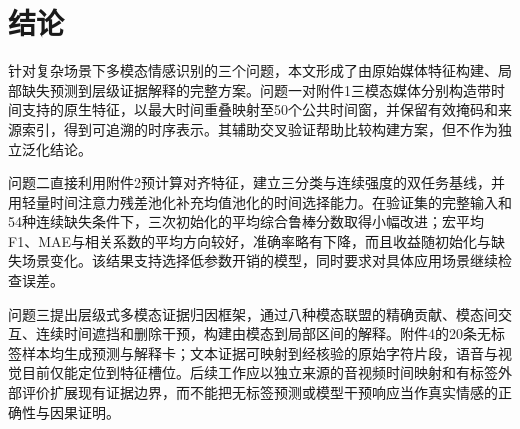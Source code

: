 \section{结论}\label{sec:conclusion}
针对复杂场景下多模态情感识别的三个问题，本文形成了由原始媒体特征构建、局部缺失预测到层级证据解释的完整方案。问题一对附件1三模态媒体分别构造带时间支持的原生特征，以最大时间重叠映射至50个公共时间窗，并保留有效掩码和来源索引，得到可追溯的时序表示。其辅助交叉验证帮助比较构建方案，但不作为独立泛化结论。

问题二直接利用附件2预计算对齐特征，建立三分类与连续强度的双任务基线，并用轻量时间注意力残差池化补充均值池化的时间选择能力。在验证集的完整输入和54种连续缺失条件下，三次初始化的平均综合鲁棒分数取得小幅改进；宏平均F1、MAE与相关系数的平均方向较好，准确率略有下降，而且收益随初始化与缺失场景变化。该结果支持选择低参数开销的模型，同时要求对具体应用场景继续检查误差。

问题三提出层级式多模态证据归因框架，通过八种模态联盟的精确贡献、模态间交互、连续时间遮挡和删除干预，构建由模态到局部区间的解释。附件4的20条无标签样本均生成预测与解释卡；文本证据可映射到经核验的原始字符片段，语音与视觉目前仅能定位到特征槽位。后续工作应以独立来源的音视频时间映射和有标签外部评价扩展现有证据边界，而不能把无标签预测或模型干预响应当作真实情感的正确性与因果证明。
